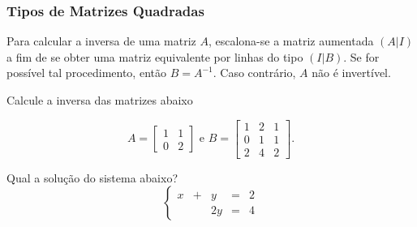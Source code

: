 
\begin{frame}
    \frametitle{Tipos de Matrizes Quadradas}

    Para calcular a inversa de uma matriz $A$, escalona-se a matriz aumentada $(A|I)$ a fim de se obter uma matriz equivalente por linhas do tipo $(I|B)$. Se for possível tal procedimento, então $B = A^{-1}$. Caso contrário, $A$ não é invertível.
    
    \begin{exemplo}\label{exinversa}
        Calcule a inversa das matrizes abaixo
        
        \begin{displaymath} A = 
            \begin{bmatrix}
                1 & 1  \\
                0 & 2
            \end{bmatrix}
        \text{ e } B = 
            \begin{bmatrix}
                1 & 2 & 1 \\
                0 & 1 & 1 \\
                2 & 4 & 2 
            \end{bmatrix}.
        \end{displaymath}
    \end{exemplo}\pause

    \begin{exemplo}
        Qual a solução do sistema abaixo?
        $$\left\{
        \begin{array}{rrrrr}
        x &+& y & = &2 \\
        & & 2y& =& 4 
        \end{array} \right.$$
    \end{exemplo}
\end{frame}

